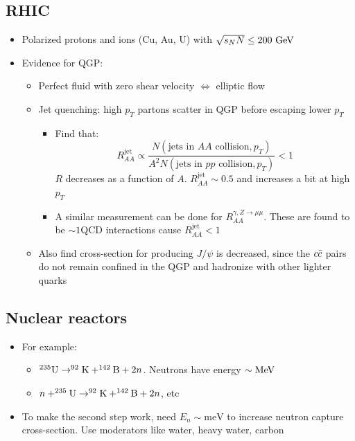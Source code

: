 \subsection{RHIC}
\begin{itemize}
  \item Polarized protons and ions (Cu, Au, U) with $\sqrt{s_NN} \leq 200~\text{GeV}$
  \item Evidence for QGP:
  \begin{itemize}
    \item Perfect fluid with zero shear velocity $\Leftrightarrow$ elliptic flow
    \item Jet quenching: high $p_T$ partons scatter in QGP before escaping \thus lower $p_T$
    \begin{itemize}
      \item Find that:
      \begin{equation}
        R^\text{jet}_{AA} \propto \dfrac{N(\text{jets in $AA$ collision},p_T)}{A^2 N(\text{jets in $pp$ collision},p_T)} < 1
      \end{equation}
      $R$ decreases as a function of $A$. $R_{AA}^\text{jet}\sim 0.5$ and increases a bit at high $p_T$
      \item A similar measurement can be done for $R_{AA}^{\gamma,Z\rightarrow\mu\mu}$. These are found to be $\sim 1$\thus QCD interactions cause $R_{AA}^\text{jet}<1$
    \end{itemize}
    \item Also find cross-section for producing $J/\psi$ is decreased, since the $c\bar{c}$ pairs do not remain confined in the QGP and hadronize with other lighter quarks
  \end{itemize}
\end{itemize}

\subsection{Nuclear reactors}
\begin{itemize}
  \item For example:
  \begin{itemize}
    \item  $^{235}\text{U}\rightarrow^{92}\text{K}+^{142}\text{B}+2n$. Neutrons have energy $\sim\text{MeV}$
    \item $n+^{235}\text{U} \rightarrow ^{92}\text{K}+^{142}\text{B} + 2n$, etc
  \end{itemize}
  \item To make the second step work, need $E_n \sim \text{meV}$ to increase neutron capture cross-section. Use moderators like water, heavy water, carbon
\end{itemize}

